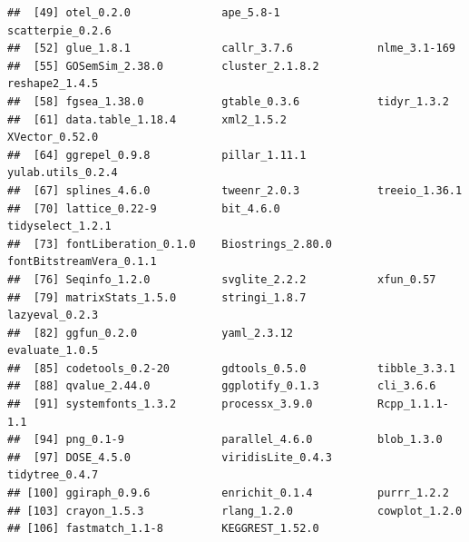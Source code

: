 \documentclass[
  11pt,
]{article}
\begin{document}
\begin{verbatim}
##  [49] otel_0.2.0              ape_5.8-1               scatterpie_0.2.6       
##  [52] glue_1.8.1              callr_3.7.6             nlme_3.1-169           
##  [55] GOSemSim_2.38.0         cluster_2.1.8.2         reshape2_1.4.5         
##  [58] fgsea_1.38.0            gtable_0.3.6            tidyr_1.3.2            
##  [61] data.table_1.18.4       xml2_1.5.2              XVector_0.52.0         
##  [64] ggrepel_0.9.8           pillar_1.11.1           yulab.utils_0.2.4      
##  [67] splines_4.6.0           tweenr_2.0.3            treeio_1.36.1          
##  [70] lattice_0.22-9          bit_4.6.0               tidyselect_1.2.1       
##  [73] fontLiberation_0.1.0    Biostrings_2.80.0       fontBitstreamVera_0.1.1
##  [76] Seqinfo_1.2.0           svglite_2.2.2           xfun_0.57              
##  [79] matrixStats_1.5.0       stringi_1.8.7           lazyeval_0.2.3         
##  [82] ggfun_0.2.0             yaml_2.3.12             evaluate_1.0.5         
##  [85] codetools_0.2-20        gdtools_0.5.0           tibble_3.3.1           
##  [88] qvalue_2.44.0           ggplotify_0.1.3         cli_3.6.6              
##  [91] systemfonts_1.3.2       processx_3.9.0          Rcpp_1.1.1-1.1         
##  [94] png_0.1-9               parallel_4.6.0          blob_1.3.0             
##  [97] DOSE_4.5.0              viridisLite_0.4.3       tidytree_0.4.7         
## [100] ggiraph_0.9.6           enrichit_0.1.4          purrr_1.2.2            
## [103] crayon_1.5.3            rlang_1.2.0             cowplot_1.2.0          
## [106] fastmatch_1.1-8         KEGGREST_1.52.0
\end{verbatim}
\end{document}
